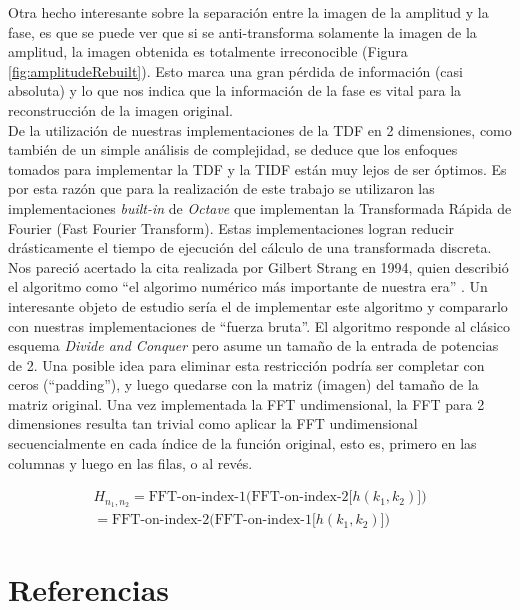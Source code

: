 \documentclass[twocolumn,a4paper,10pt]{article}
\begin{document}
Otra hecho interesante sobre la separaci\'on entre la imagen de la amplitud y la fase, es que se puede ver que si se anti-transforma solamente la imagen de la 
amplitud, la imagen obtenida es totalmente irreconocible (Figura \ref{fig:amplitudeRebuilt}). Esto marca una gran p\'erdida de informaci\'on (casi absoluta) 
y lo que nos indica que la informaci\'on
de la fase es vital para la reconstrucci\'on de la imagen original.\\

De la utilizaci\'on de nuestras implementaciones de la TDF en 2 dimensiones, como tambi\'en de un simple an\'alisis de complejidad, se deduce que los enfoques 
tomados para implementar la TDF y la TIDF est\'an muy lejos de ser \'optimos. Es por esta raz\'on que para la realizaci\'on de este trabajo se utilizaron las 
implementaciones \textit{built-in} de \textit{Octave} que implementan la Transformada R\'apida de Fourier (Fast Fourier Transform). Estas implementaciones 
logran reducir dr\'asticamente el tiempo de ejecuci\'on del c\'alculo de una transformada discreta. Nos pareci\'o acertado la cita realizada por 
Gilbert Strang en 1994, quien describi\'o el algoritmo como ``el algorimo num\'erico m\'as importante de nuestra era'' \cite{Wikipedia_FFT_quote} 
\cite{Strang-quote}. Un interesante objeto de estudio ser\'ia el de implementar este algoritmo y compararlo con nuestras implementaciones de ``fuerza bruta''.
El algoritmo responde al cl\'asico esquema \textit{Divide and Conquer} pero asume un tamaño de la entrada de potencias de 2. Una posible idea para eliminar esta
restricci\'on podr\'ia ser completar con ceros (``padding''), y luego quedarse con la matriz (imagen) del tamaño de la matriz original. Una vez implementada
la FFT undimensional, la FFT para 2 dimensiones resulta tan trivial como aplicar la FFT undimensional secuencialmente en cada \'indice de la funci\'on original,
esto es, primero en las columnas y luego en las filas, o al rev\'es\cite{NumericalRecipes}.

\begin{equation}
    \left.
        \begin{array}{l}
            H_{n_1,n_2}  = \mbox{FFT-on-index-1(FFT-on-index-2[} h(k_1, k_2) \mbox{])} \\
            = \mbox{FFT-on-index-2(FFT-on-index-1[} h(k_1, k_2) \mbox{])}
        \end{array}               
    \right.
\end{equation}


\section*{Referencias}
\end{document}
